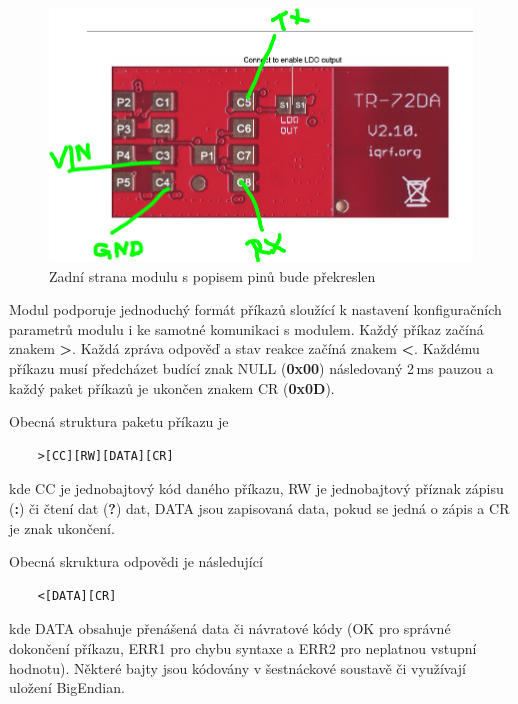  \begin{figure}[!h]
  \begin{center}
    \includegraphics[scale=0.4]{obrazky/modul_zada}
  \end{center}
  \caption{Zadní strana modulu s popisem pinů \colorbox[rgb]{0,1,0}{bude překreslen}}
\end{figure}

Modul podporuje jednoduchý formát příkazů sloužící k nastavení konfiguračních parametrů modulu i ke samotné komunikaci s modulem. Každý příkaz začíná znakem \textbf{>}. Každá zpráva odpověď a stav reakce začíná znakem \textbf{<}. Každému příkazu musí předcházet budící znak NULL (\textbf{0x00}) následovaný 2\,ms pauzou a každý paket příkazů je ukončen znakem CR (\textbf{0x0D}). 

Obecná struktura\cite{iqrfmodul} paketu příkazu je 

\begin{verbatim}
	>[CC][RW][DATA][CR]
\end{verbatim}

kde CC je jednobajtový kód daného příkazu, RW je jednobajtový příznak zápisu (\textbf{:}) či čtení dat (\textbf{?}) dat, DATA jsou zapisovaná data, pokud se jedná o zápis a CR je znak ukončení.

Obecná skruktura odpovědi je následující

\begin{verbatim}
	<[DATA][CR]
\end{verbatim}

kde DATA obsahuje přenášená data či návratové kódy (OK pro správné dokončení příkazu, ERR1 pro chybu syntaxe a ERR2 pro neplatnou vstupní hodnotu). Některé bajty jsou kódovány v šestnáckové soustavě či využívají uložení BigEndian.

